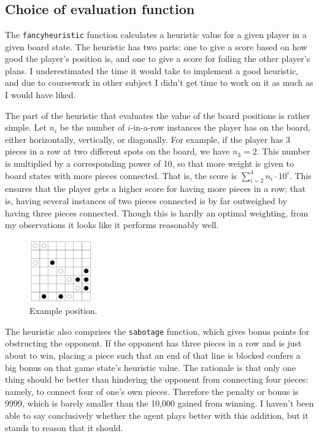 \documentclass[letterpaper, 10pt]{article}
\numberwithin{theorem}{section}
\begin{document}
\section{}
\subsection{Choice of evaluation function}
The \texttt{fancyheuristic} function calculates a heuristic value for a given player in a given board state. The heuristic has two parts: one to give a score based on how good the player's position is, and one to give a score for foiling the other player's plans. I underestimated the time it would take to implement a good heuristic, and due to coursework in other subject I didn't get time to work on it as much as I would have liked.

The part of the heuristic that evaluates the value of the board positions is rather simple. Let $n_i$ be the number of $i$-in-a-row instances the player has on the board, either horizontally, vertically, or diagonally. For example, if the player has 3 pieces in a row at two different spots on the board, we have $n_3 = 2$. This number is multiplied by a corresponding power of 10, so that more weight is given to board states with more pieces connected. That is, the score is $\sum_{i=2}^4 n_i \cdot 10^i$. This ensures that the player gets a higher score for having more pieces in a row; that is, having several instances of two pieces connected is by far outweighed by having three pieces connected. Though this is hardly an optimal weighting, from my observations it looks like it performs reasonably well.

\begin{figure}
	\centering
	\includegraphics[width=0.24\textwidth]{examplestate}
	\caption{Example position.}
	\label{fig:heuristic}
\end{figure}
The heuristic also comprises the \texttt{sabotage} function, which gives bonus points for obstructing the opponent. If the opponent has three pieces in a row and is just about to win, placing a piece such that an end of that line is blocked confers a big bonus on that game state's heuristic value. The rationale is that only one thing should be better than hindering the opponent from connecting four pieces: namely, to connect four of one's own pieces. Therefore the penalty or bonus is 9999, which is barely smaller than the 10,000 gained from winning. I haven't been able to say conclusively whether the agent plays better with this addition, but it stands to reason that it should.
\end{document}
